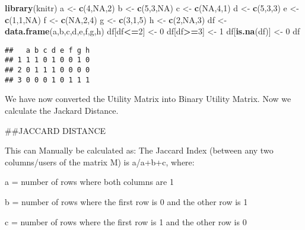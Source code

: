 \documentclass[
]{article}
\newenvironment{Shaded}{\begin{snugshade}}{\end{snugshade}}
\newcommand{\DecValTok}[1]{\textcolor[rgb]{0.00,0.00,0.81}{#1}}
\newcommand{\KeywordTok}[1]{\textcolor[rgb]{0.13,0.29,0.53}{\textbf{#1}}}
\newcommand{\NormalTok}[1]{#1}
\newcommand{\OperatorTok}[1]{\textcolor[rgb]{0.81,0.36,0.00}{\textbf{#1}}}
\newcommand{\OtherTok}[1]{\textcolor[rgb]{0.56,0.35,0.01}{#1}}
\newcommand{\StringTok}[1]{\textcolor[rgb]{0.31,0.60,0.02}{#1}}
\begin{document}
\begin{Shaded}
\begin{Highlighting}[]
\KeywordTok{library}\NormalTok{(knitr)}
\NormalTok{a <-}\StringTok{ }\KeywordTok{c}\NormalTok{(}\DecValTok{4}\NormalTok{,}\OtherTok{NA}\NormalTok{,}\DecValTok{2}\NormalTok{)}
\NormalTok{b <-}\StringTok{ }\KeywordTok{c}\NormalTok{(}\DecValTok{5}\NormalTok{,}\DecValTok{3}\NormalTok{,}\OtherTok{NA}\NormalTok{)}
\NormalTok{c <-}\StringTok{ }\KeywordTok{c}\NormalTok{(}\OtherTok{NA}\NormalTok{,}\DecValTok{4}\NormalTok{,}\DecValTok{1}\NormalTok{)}
\NormalTok{d <-}\StringTok{ }\KeywordTok{c}\NormalTok{(}\DecValTok{5}\NormalTok{,}\DecValTok{3}\NormalTok{,}\DecValTok{3}\NormalTok{)}
\NormalTok{e <-}\StringTok{ }\KeywordTok{c}\NormalTok{(}\DecValTok{1}\NormalTok{,}\DecValTok{1}\NormalTok{,}\OtherTok{NA}\NormalTok{)}
\NormalTok{f <-}\StringTok{ }\KeywordTok{c}\NormalTok{(}\OtherTok{NA}\NormalTok{,}\DecValTok{2}\NormalTok{,}\DecValTok{4}\NormalTok{)}
\NormalTok{g <-}\StringTok{ }\KeywordTok{c}\NormalTok{(}\DecValTok{3}\NormalTok{,}\DecValTok{1}\NormalTok{,}\DecValTok{5}\NormalTok{)}
\NormalTok{h <-}\StringTok{ }\KeywordTok{c}\NormalTok{(}\DecValTok{2}\NormalTok{,}\OtherTok{NA}\NormalTok{,}\DecValTok{3}\NormalTok{)}
\NormalTok{df <-}\StringTok{ }\KeywordTok{data.frame}\NormalTok{(a,b,c,d,e,f,g,h)}
\NormalTok{df[df}\OperatorTok{<=}\DecValTok{2}\NormalTok{] <-}\StringTok{ }\DecValTok{0}
\NormalTok{df[df}\OperatorTok{>=}\DecValTok{3}\NormalTok{] <-}\StringTok{ }\DecValTok{1}
\NormalTok{df[}\KeywordTok{is.na}\NormalTok{(df)] <-}\StringTok{ }\DecValTok{0}
\NormalTok{df}
\end{Highlighting}
\end{Shaded}

\begin{verbatim}
##   a b c d e f g h
## 1 1 1 0 1 0 0 1 0
## 2 0 1 1 1 0 0 0 0
## 3 0 0 0 1 0 1 1 1
\end{verbatim}

We have now converted the Utility Matrix into Binary Utility Matrix. Now
we calculate the Jackard Distance.

\#\#JACCARD DISTANCE

This can Manually be calculated as: The Jaccard Index (between any two
columns/users of the matrix M) is a/a+b+c, where:

a = number of rows where both columns are 1

b = number of rows where the first row is 0 and the other row is 1

c = number of rows where the first row is 1 and the other row is 0
\end{document}
